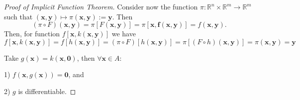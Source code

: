 \begin{proof}[Proof of Implicit Function Theorem]
    Consider now the function $\pi : \mathbb{R}^{n} \times \mathbb{R}^{m} \to \mathbb{R}^{m}$ such that $(\mathbf{x,y}) \mapsto \pi (\mathbf{x,y}) := \mathbf{y}$. Then \[
        (\pi \circ F)(\mathbf{x,y}) = \pi [F(\mathbf{x,y})] = \pi [\mathbf{x, f(\mathbf{x,y})}] = f(\mathbf{x,y}).
    \]
    Then, for function $f[\mathbf{x}, k(\mathbf{x,y})] $ we have \[
        f[\mathbf{x}, k(\mathbf{x,y})] = f[h(\mathbf{x,y})] = (\pi \circ F)[h(\mathbf{x,y})] = \pi [(F \circ h)(\mathbf{x,y})] = \pi (\mathbf{x,y}) = \mathbf{y}
    \]

    Take $g(\mathbf{x}) = k(\mathbf{x, 0})$, then $\forall \mathbf{x} \in A$:

    1) $f(\mathbf{x},g(\mathbf{x})) = \mathbf{0}$, and

    2) $g$ is differentiable.
\end{proof}





